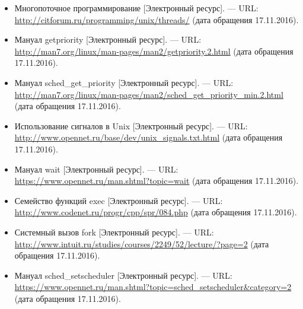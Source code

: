 \documentclass[14pt,a4paper,report]{report}
\begin{document}
\begin{itemize}
	

	\item Многопоточное программирование [Электронный ресурс]. — URL: \href{http://citforum.ru/programming/unix/threads/}{http://citforum.ru/programming/unix/\linebreak threads/} (дата обращения 17.11.2016).
	
	\item Мануал getpriority [Электронный ресурс]. — URL: \href{http://man7.org/linux/man-pages/man2/getpriority.2.html}{http://man7.org/linux/man-pages/man2/getpriority.\linebreak 2.html} (дата обращения 17.11.2016).
	
	\item Мануал sched\_get\_priority [Электронный ресурс]. — URL: \href{http://man7.org/linux/man-pages/man2/sched_get_priority_min.2.html}{http://man7.org/linux/man-pages/man2/sched\linebreak \_get\_priority\_min.2.html} (дата обращения 17.11.2016).
	
	\item Использование сигналов в Unix [Электронный ресурс]. — URL: \href{http://www.opennet.ru/base/dev/unix_signals.txt.html}{http://www.opennet.ru/base/dev/unix\linebreak \_signals.txt.html} (дата обращения 17.11.2016).
	
	\item Мануал wait [Электронный ресурс]. — URL: \href{https://www.opennet.ru/man.shtml?topic=wait}{https://www.opennet.ru/man.shtml?topic=wait} (дата обращения 17.11.2016).
	
	\item Семейство функций exec [Электронный ресурс]. — URL: \href{http://www.codenet.ru/progr/cpp/spr/084.php}{http://www.codenet.ru/progr/cpp/spr/084.php} (дата обращения 17.11.2016).
	
	\item Системный вызов fork [Электронный ресурс]. — URL: \href{http://www.intuit.ru/studies/courses/2249/52/lecture/1552?page=2}{http://www.intuit.ru/studies/courses/2249/52/lecture/?page=2} (дата обращения 17.11.2016).
	
	\item Мануал sched\_setscheduler [Электронный ресурс]. — URL: \href{https://www.opennet.ru/man.shtml?topic=sched_setscheduler&category=2}{https://www.opennet.ru/man.shtml?topic=sched\linebreak \_setscheduler\&category=2} (дата обращения 17.11.2016).
	

\end{itemize}
\end{document}
